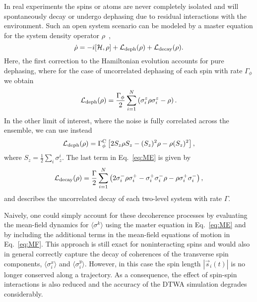 \documentclass[pra,twocolumn,showpacs,preprintnumbers,amsmath,amssymb,superscriptaddress]{revtex4-1}
\begin{document}
In real experiments the spins or atoms are never completely isolated and will spontaneously decay or undergo dephasing due to residual interactions with the environment.  Such an open system scenario can be modeled by a master equation for the system density operator $\rho$~\cite{WallsMilburn,GardinerZoller}, 
\begin{equation}\label{eq:ME}
\dot{\rho}=-i [\mathcal{H},\rho]+ \mathcal{L}_{\rm deph}(\rho)+ \mathcal{L}_{\rm decay}(\rho).
\end{equation}
Here, the first correction to the Hamiltonian evolution accounts for pure dephasing, where for the case of uncorrelated dephasing of each spin with rate $\Gamma_\phi$ we obtain
\begin{equation}\label{eq:LindbladDeph}
\mathcal{L}_{\rm deph}(\rho)=\frac{\Gamma_{\phi}}{2} \sum_{i=1}^N \left(\sigma_i^z \rho \sigma_i^z - \rho\right).  %
\end{equation}
In the other limit of interest, where the noise is fully correlated across the ensemble, we can use instead 
\begin{equation}
\mathcal{L}_{\rm deph}(\rho)= \Gamma_{\phi}^{\rm C} \left[2S_z \rho S_z - (S_z)^2\rho - \rho (S_z)^2 \right],
\end{equation}
where $S_z=\frac{1}{2}\sum_i \sigma^i_z$. The last term in Eq.~\eqref{eq:ME} is given by 
\begin{equation}
\mathcal{L}_{\rm decay}(\rho)= \frac{\Gamma}{2} \sum_{i=1}^N \left(2\sigma_i^- \rho\sigma_i^+ -  \sigma_i^+\sigma_i^- \rho - \rho  \sigma_i^+\sigma_i^- \right), 
\end{equation}
and describes the uncorrelated decay of each two-level system with rate $\Gamma$.

Naively, one could simply account for these decoherence processes by evaluating the mean-field dynamics for $\langle \sigma^k\rangle$ using the master equation in Eq.~\eqref{eq:ME} and by including the additional terms in the mean-field equations of motion in Eq.~\eqref{eq:MF}. This approach is still exact for noninteracting spins and would also in general correctly capture the decay of coherences of the transverse spin components, $\langle \sigma_i^x\rangle $ and $\langle \sigma_i^y\rangle$. However, in this case the spin length $|\vec s_i(t)|$ is no longer conserved along a trajectory. As a consequence, the effect of spin-spin interactions is also reduced and the accuracy of the DTWA simulation degrades considerably. 
\end{document}
